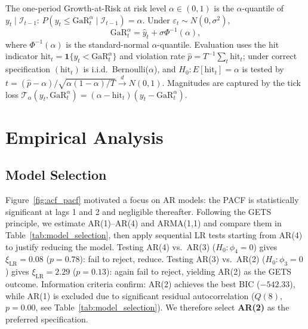 \documentclass[12pt]{article}
\begin{document}
The one-period Growth-at-Risk at risk level $\alpha\in(0,1)$ is the $\alpha$-quantile of $y_t\mid\mathcal{I}_{t-1}$: $P(y_t \leq \mathrm{GaR}^\alpha_t \mid \mathcal{I}_{t-1}) = \alpha$. Under $\varepsilon_t \sim N(0,\sigma^2)$,
\begin{equation}\label{eq:gar}
  \mathrm{GaR}^\alpha_t = \hat{y}_t + \sigma\Phi^{-1}(\alpha),
\end{equation}
where $\Phi^{-1}(\alpha)$ is the standard-normal $\alpha$-quantile.
\newline
Evaluation uses the hit indicator $\mathrm{hit}_t = \mathbf{1}\{y_t < \mathrm{GaR}^\alpha_t\}$ and violation rate $\hat{p} = T^{-1}\sum_t \mathrm{hit}_t$; under correct specification $(\mathrm{hit}_t)$ is i.i.d.\ Bernoulli($\alpha$), and $H_0\colon E[\mathrm{hit}_t]=\alpha$ is tested by $t = (\hat{p}-\alpha)/\sqrt{\alpha(1-\alpha)/T} \xrightarrow{d} N(0,1)$. Magnitudes are captured by the tick loss $\mathcal{T}_\alpha(y_t, \mathrm{GaR}^\alpha_t) = (\alpha - \mathrm{hit}_t)(y_t - \mathrm{GaR}^\alpha_t)$.


\section{Empirical Analysis}

\subsection{Model Selection}

Figure~\ref{fig:acf_pacf} motivated a focus on AR models: the PACF is statistically significant at lags 1 and 2 and negligible thereafter. Following the GETS principle, we estimate AR(1)--AR(4) and ARMA(1,1) and compare them in Table~\ref{tab:model_selection}, then apply sequential LR tests starting from AR(4) to justify reducing the model.
\newline
\newline
Testing AR(4) vs.\ AR(3) ($H_0\colon \phi_4=0$) gives $\xi_{\mathrm{LR}}=0.08$ ($p=0.78$): fail to reject, reduce. Testing AR(3) vs.\ AR(2) ($H_0\colon \phi_3=0$) gives $\xi_{\mathrm{LR}}=2.29$ ($p=0.13$): again fail to reject, yielding AR(2) as the GETS outcome. Information criteria confirm: AR(2) achieves the best BIC ($-542.33$), while AR(1) is excluded due to significant residual autocorrelation ($Q(8)$, $p=0.00$, see Table~\ref{tab:model_selection}). We therefore select \textbf{AR(2)} as the preferred specification.
\end{document}
